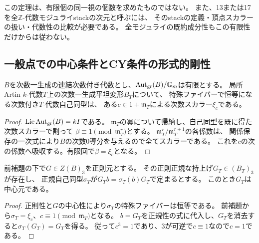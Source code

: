 この定理は、有限個の同一視の個数を求めたものではない。
また、13または17を全$\mathbb Z$-代数モジュライstackの次元と呼ぶには、
そのstackの定義・頂点スカラーの扱い・代数性の比較が必要である。
全モジュライの既約成分性もこの有限性だけからは従わない。

\subsection{一般点での中心条件とCY条件の形式的剛性}
\begin{lemma}[単位に還元する次数付き自己同型]\label{lem:scalar-automorphism-rigidity}
$B$を次数一生成の連結次数付き代数とし、$\operatorname{Aut}_{\mathrm{gr}}(B)/\mathbb G_m$は有限とする。
局所Artin $k$-代数$T$上の次数一生成平坦変形$B_T$について、
特殊ファイバーで恒等になる次数付き$T$-代数自己同型は、
ある$c\in1+\mathfrak m_T$による次数スカラー$\xi_c$である。
\end{lemma}
\begin{proof}
$\operatorname{Lie}\operatorname{Aut}_{\mathrm{gr}}(B)=kI$である。
$\mathfrak m_T$の冪について帰納し、自己同型を既に得た次数スカラーで割って
$\beta\equiv1\pmod{\mathfrak m_T^r}$とする。
$\mathfrak m_T^r/\mathfrak m_T^{r+1}$の各係数は、
関係保存の一次式により$B$の次数0導分を与えるので全てスカラーである。
これを$c$の次の係数へ吸収する。有限回で$\beta=\xi_c$となる。
\end{proof}

\begin{corollary}[中心三次の近傍では正規条件は中心条件になる]
\label{cor:normal-central-artin-rigidity}
前補題の下で$G\in Z(B)_3$を正則元とする。
その正則正規な持上げ$G_T\in(B_T)_3$が存在し、
正規自己同型$\sigma_T$が$G_Tb=\sigma_T(b)G_T$で定まるとする。
このとき$G_T$は中心元である。
\end{corollary}
\begin{proof}
正則性と$G$の中心性により$\sigma_T$の特殊ファイバーは恒等である。
前補題から$\sigma_T=\xi_c$、$c\equiv1\pmod{\mathfrak m_T}$となる。
$b=G_T$を正規性の式に代入し、$G_T$を消去すると$\sigma_T(G_T)=G_T$を得る。
従って$c^3=1$であり、3が可逆で$c\equiv1$なので$c=1$である。
\end{proof}

